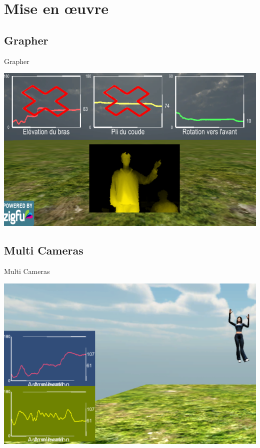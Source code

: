 \section{Mise en \oe{}uvre}

\begin{frame}
\end{frame}

\subsection{Grapher}
\begin{frame}{Grapher}
\begin{center}
\includegraphics[width=0.9\linewidth]{../images/zfm_graph}
\end{center}
\end{frame}

\subsection{Multi Cameras}
\begin{frame}{Multi Cameras}
\begin{center}
\includegraphics[width=0.9\linewidth]{../images/multicamera}
\end{center}
\end{frame}

